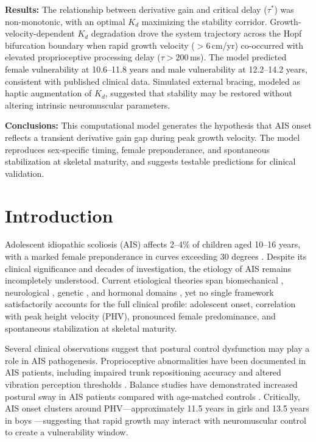 \documentclass[12pt,a4paper]{article}
\begin{document}
\noindent\textbf{Results:}
The relationship between derivative gain and critical delay ($\tau^*$) was non-monotonic, with an optimal $K_d$ maximizing the stability corridor. Growth-velocity-dependent $K_d$ degradation drove the system trajectory across the Hopf bifurcation boundary when rapid growth velocity ($>$6\,cm/yr) co-occurred with elevated proprioceptive processing delay ($\tau > 200$\,ms). The model predicted female vulnerability at 10.6--11.8 years and male vulnerability at 12.2--14.2 years, consistent with published clinical data. Simulated external bracing, modeled as haptic augmentation of $K_d$, suggested that stability may be restored without altering intrinsic neuromuscular parameters.

\noindent\textbf{Conclusions:}
This computational model generates the hypothesis that AIS onset reflects a transient derivative gain gap during peak growth velocity. The model reproduces sex-specific timing, female preponderance, and spontaneous stabilization at skeletal maturity, and suggests testable predictions for clinical validation.

\newpage

\section{Introduction}

Adolescent idiopathic scoliosis (AIS) affects 2--4\% of children aged 10--16 years, with a marked female preponderance in curves exceeding 30 degrees \citep{cheng2015prevalence, grivas2006scoliosis}. Despite its clinical significance and decades of investigation, the etiology of AIS remains incompletely understood. Current etiological theories span biomechanical \citep{stokes2006hueter, villemure2009growth}, neurological \citep{lao2008proprioceptive, assaraf2020piezo2}, genetic \citep{sharma2011genome}, and hormonal domains \citep{burwell2009aetiopathogenesis}, yet no single framework satisfactorily accounts for the full clinical profile: adolescent onset, correlation with peak height velocity (PHV), pronounced female predominance, and spontaneous stabilization at skeletal maturity.

Several clinical observations suggest that postural control dysfunction may play a role in AIS pathogenesis. Proprioceptive abnormalities have been documented in AIS patients, including impaired trunk repositioning accuracy and altered vibration perception thresholds \citep{lao2008proprioceptive, simoneau2006altered}. Balance studies have demonstrated increased postural sway in AIS patients compared with age-matched controls \citep{dalleau2012postural}. Critically, AIS onset clusters around PHV---approximately 11.5 years in girls and 13.5 years in boys \citep{sanders2017maturity}---suggesting that rapid growth may interact with neuromuscular control to create a vulnerability window.
\end{document}
